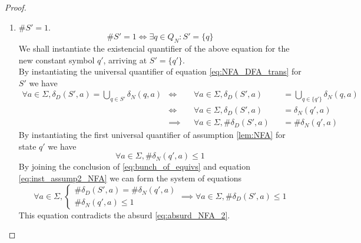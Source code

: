 {\begin{proof}
\begin{enumerate}
			\begin{equation}
				\#S'=0 \iff S'=\emptyset
			\end{equation}
			By convention, $\forall a \in \Sigma, \delta_D(\emptyset,a)=\emptyset$.
			\begin{equation}
				\forall a \in \Sigma, \delta_D(\emptyset,a)=\emptyset
				\iff \forall a \in \Sigma, \delta_D(S',a)=\emptyset
			\end{equation}
			which contradicts the absurd \eqref{eq:absurd_NFA_2}.
		\item $\#S'=1$.
			\begin{equation}
				\#S'=1 \iff \exists q \in Q_N\colon S'=\{q\}
			\end{equation}
			We shall instantiate the existencial quantifier of the above equation for the new constant symbol $q'$, arriving at $S'=\{q'\}$.\\
			By instantiating the universal quantifier of equation \eqref{eq:NFA_DFA_trans} for $S'$ we have
			\begin{equation} \label{eq:bunch_of_equivs}
			\begin{alignedat}{3}
				\forall a \in \Sigma, \delta_D(S',a)=\bigcup_{q\in S'}{\delta_N(q,a)}
				&\iff     && \forall a \in \Sigma, \delta_D(S',a)  &&=\bigcup_{q\in \{q'\}}{\delta_N(q,a)}\\
				&\iff     && \forall a \in \Sigma, \delta_D(S',a)  &&=\delta_N(q',a)\\
				&\implies && \forall a \in \Sigma, \#\delta_D(S',a)&&=\#\delta_N(q',a)
			\end{alignedat}
			\end{equation}
			By instantiating the first universal quantifier of assumption \eqref{lem:NFA} for state $q'$ we have
			\begin{equation} \label{eq:inst_assump2_NFA}
				\forall a \in \Sigma, \#\delta_N(q',a)\leq 1
			\end{equation}
			By joining the conclusion of \eqref{eq:bunch_of_equivs} and equation \eqref{eq:inst_assump2_NFA} we can form the system of equations
			\begin{equation}
				\forall a \in \Sigma, \begin{cases}
						\#\delta_D(S',a)=\#\delta_N(q',a)\\
						\#\delta_N(q',a)\leq 1
					\end{cases}
				\implies \forall a \in \Sigma, \#\delta_D(S',a)\leq 1
			\end{equation}
			This equation contradicts the absurd \eqref{eq:absurd_NFA_2}.

\end{enumerate}
\end{proof}}
